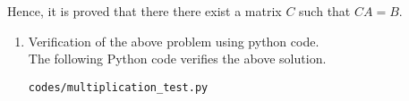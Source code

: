 \documentclass[journal,12pt,twocolumn]{IEEEtran}
\renewcommand\thesection{\arabic{section}}
\begin{document}
Hence, it is proved that there there exist a matrix $C$ such that $CA=B$.
\renewcommand{\theequation}{\theenumi}
\begin{enumerate}[label=\thesection.\arabic*.,ref=\thesection.\theenumi]
\item Verification of the above problem using python code.\\
\solution The  following Python code verifies the above solution.
\begin{lstlisting}
codes/multiplication_test.py
\end{lstlisting}
\end{enumerate}
\end{document}
